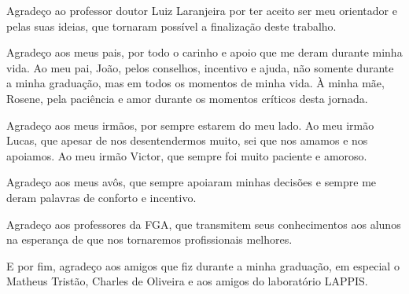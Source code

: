 \begin{agradecimentos}

Agradeço ao professor doutor Luiz Laranjeira por ter aceito ser meu orientador e pelas suas ideias, que tornaram possível a finalização deste trabalho.

Agradeço aos meus pais, por todo o carinho e apoio que me deram durante minha vida. Ao meu pai, João, pelos conselhos, incentivo e ajuda, não somente durante a minha graduação, mas em todos os momentos de minha vida. À minha mãe, Rosene, pela paciência e amor durante os momentos críticos desta jornada.

Agradeço aos meus irmãos, por sempre estarem do meu lado. Ao meu irmão Lucas, que apesar de nos desentendermos muito, sei que nos amamos e nos apoiamos. Ao meu irmão Victor, que sempre foi muito paciente e amoroso.

Agradeço aos meus avôs, que sempre apoiaram minhas decisões e sempre me deram palavras de conforto e incentivo.

Agradeço aos professores da FGA, que transmitem seus conhecimentos aos alunos na esperança de que nos tornaremos profissionais melhores.

E por fim, agradeço aos amigos que fiz durante a minha graduação, em especial o Matheus Tristão, Charles de Oliveira e aos amigos do laboratório LAPPIS. 
\end{agradecimentos}